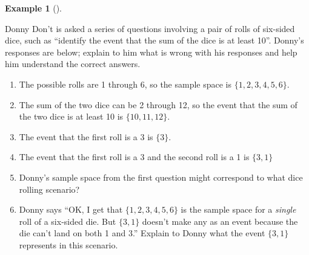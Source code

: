\documentclass[
  letterpaper,
  DIV=11,
  numbers=noendperiod]{scrreprt}
\providecommand{\tightlist}{%
  \setlength{\itemsep}{0pt}\setlength{\parskip}{0pt}}
\theoremstyle{plain}
\theoremstyle{definition}
\newtheorem{example}{Example}[chapter]
\theoremstyle{definition}
\theoremstyle{definition}
\theoremstyle{remark}
\begin{document}
\begin{tcolorbox}[enhanced jigsaw, opacityback=0, left=2mm, colframe=quarto-callout-note-color-frame, toprule=.15mm, breakable, colback=white, leftrule=.75mm, arc=.35mm, rightrule=.15mm, bottomrule=.15mm]

\begin{example}[]\protect\hypertarget{exm-dd-event}{}\label{exm-dd-event}

Donny Don't is asked a series of questions involving a pair of rolls of
six-sided dice, such as ``identify the event that the sum of the dice is
at least 10''. Donny's responses are below; explain to him what is wrong
with his responses and help him understand the correct answers.

\begin{enumerate}
\def\labelenumi{\arabic{enumi}.}
\tightlist
\item
  The possible rolls are 1 through 6, so the sample space is
  \(\{1, 2, 3, 4, 5, 6\}\).
\item
  The sum of the two dice can be 2 through 12, so the event that the sum
  of the two dice is at least 10 is \(\{10, 11, 12\}\).
\item
  The event that the first roll is a 3 is \(\{3\}\).
\item
  The event that the first roll is a 3 and the second roll is a 1 is
  \(\{3, 1\}\)
\item
  Donny's sample space from the first question might correspond to what
  dice rolling scenario?
\item
  Donny says ``OK, I get that \(\{1, 2, 3, 4, 5, 6\}\) is the sample
  space for a \emph{single} roll of a six-sided die. But \(\{3, 1\}\)
  doesn't make any as an event because the die can't land on both 1 and
  3.'' Explain to Donny what the event \(\{3, 1\}\) represents in this
  scenario.
\end{enumerate}

\end{example}

\end{tcolorbox}
\end{document}
